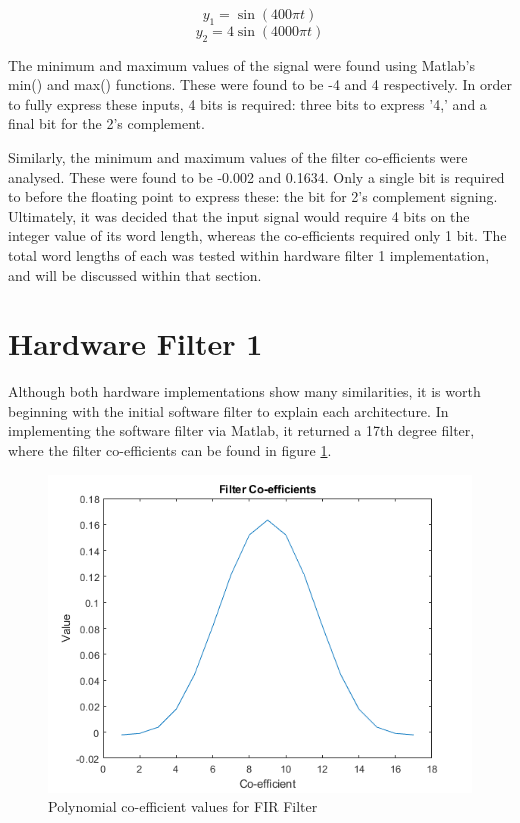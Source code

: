 \documentclass[12pt,a4paper]{article}
\begin{document}
\[y_1 = \sin(400\pi t)\]
\[y_2 = 4\sin(4000\pi t)\]

The minimum and maximum values of the signal were found using Matlab's min() and max() functions. These were found to be -4 and 4 respectively. In order to fully express these inputs, 4 bits is required: three bits to express '4,' and a final bit for the 2's complement.

Similarly, the minimum and maximum values of the filter co-efficients were analysed. These were found to be -0.002 and 0.1634. Only a single bit is required to before the floating point to express these: the bit for 2's complement signing. Ultimately, it was decided that the input signal would require 4 bits on the integer value of its word length, whereas the co-efficients required only 1 bit. The total word lengths of each was tested within hardware filter 1 implementation, and will be discussed within that section.

\section{Hardware Filter 1}

Although both hardware implementations show many similarities, it is worth beginning with the initial software filter to explain each architecture. In implementing the software filter via Matlab, it returned a 17th degree filter, where the filter co-efficients can be found in figure \ref{fig:coefficients}.

\begin{figure}[H]
    \centering
    \includegraphics[scale=0.25]{images/coefficients.png}
    \caption{Polynomial co-efficient values for FIR Filter}
    \label{fig:coefficients}
\end{figure}
\end{document}
